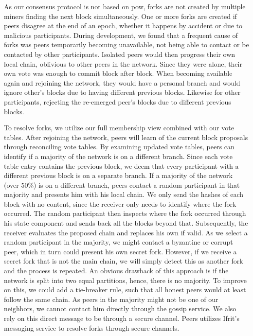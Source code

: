 \documentclass[USenglish]{uit-thesis}
\begin{document}
As our consensus protocol is not based on \gls{pow}, forks are not created by multiple miners finding the next block simultaneously. 
One or more forks are created if peers disagree at the end of an epoch, whether it happens by accident or due to malicious participants.
During development, we found that a frequent cause of forks was peers temporarily becoming unavailable, not being able to contact or be contacted by other participants.
Isolated peers would then progress their own local chain, oblivious to other peers in the network.
Since they were alone, their own vote was enough to commit block after block.
When becoming available again and rejoining the network, they would have a personal branch and would ignore other's blocks due to having different previous blocks.
Likewise for other participants, rejecting the re-emerged peer's blocks due to different previous blocks.

To resolve forks, we utilize our full membership view combined with our vote tables.
After rejoining the network, peers will learn of the current block proposals through reconciling vote tables.
By examining updated vote tables, peers can identify if a majority of the network is on a different branch.
Since each vote table entry contains the previous block, we deem that every participant with a different previous block is on a separate branch.  
If a majority of the network (over 50\%) is on a different branch, peers contact a random participant in that majority and presents him with his local chain.
We only send the hashes of each block with no content, since the receiver only needs to identify where the fork occurred.
The random participant then inspects where the fork occurred through his state component and sends back all the blocks beyond that.
Subsequently, the receiver evaluates the proposed chain and replaces his own if valid.
As we select a random participant in the majority, we might contact a byzantine or corrupt peer, which in turn could present his own secret fork.
However, if we receive a secret fork that is not the main chain, we will simply detect this as another fork and the process is repeated.
An obvious drawback of this approach is if the network is split into two equal partitions, hence, there is no majority.
To improve on this, we could add a tie-breaker rule, such that all honest peers would at least follow the same chain.
As peers in the majority might not be one of our neighbors, we cannot contact him directly through the gossip service.
We also rely on this direct message to be through a secure channel.
Peers utilizes Ifrit's messaging service to resolve forks through secure channels.
  
\end{document}

